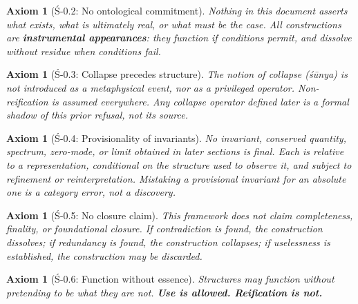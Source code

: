 \documentclass[11pt]{article}
\newtheorem{axiom}[theorem]{Axiom}
\begin{document}
\begin{axiom}[Ś-0.2: No ontological commitment]
Nothing in this document asserts what exists, what is ultimately real, or what must be the case. All constructions are \textbf{instrumental appearances}: they function if conditions permit, and dissolve without residue when conditions fail.
\end{axiom}

\begin{axiom}[Ś-0.3: Collapse precedes structure]
The notion of \emph{collapse} (śūnya) is not introduced as a metaphysical event, nor as a privileged operator. Non-reification is assumed everywhere. Any collapse operator defined later is a formal shadow of this prior refusal, not its source.
\end{axiom}

\begin{axiom}[Ś-0.4: Provisionality of invariants]
No invariant, conserved quantity, spectrum, zero-mode, or limit obtained in later sections is final. Each is relative to a representation, conditional on the structure used to observe it, and subject to refinement or reinterpretation. Mistaking a provisional invariant for an absolute one is a category error, not a discovery.
\end{axiom}

\begin{axiom}[Ś-0.5: No closure claim]
This framework does not claim completeness, finality, or foundational closure. If contradiction is found, the construction dissolves; if redundancy is found, the construction collapses; if uselessness is established, the construction may be discarded.
\end{axiom}

\begin{axiom}[Ś-0.6: Function without essence]
Structures may function without pretending to be what they are not. \textbf{Use is allowed. Reification is not.}
\end{axiom}

\begin{center}
\end{center}
\end{document}
